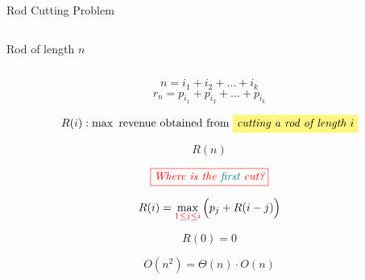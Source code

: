 
\begin{frame}{}
  \centerline{\LARGE {}}

  \vspace{0.50cm}
\end{frame}

\begin{frame}{}
  \begin{exampleblock}{Rod Cutting Problem}
    \begin{columns}
	\begin{center}
	  {\large Rod of length $n$}

	\end{center}
	\begin{table}[]
	  \centering
	\end{table}
    \end{columns}

    \vspace{0.60cm}
    \[
      n = i_1 + i_2 + \dots + i_k
    \]
    \[
      r_n = p_{i_1} + p_{i_2} + \dots + p_{i_k}
    \]
  \end{exampleblock}
\end{frame}

\begin{frame}{}
  \[
    R(i): \max \text{ revenue obtained from \hl{yellow}{\it cutting a rod of length $i$}}
  \]

  \[
    R(n)
  \]

  \pause
  \[
    \textcolor{red}{\fbox{\it Where is the {\textcolor{teal}{first}} cut?}}
  \]

  \pause
  \[
    R(i) = \max_{\textcolor{red}{1 \le j \le i}} \Big(p_j + R(i-j)\Big)
  \]

  \pause
  \[
    R(0) = 0
  \]

  \pause
  \[
    O(n^2) = \Theta(n) \cdot O(n)
  \]
\end{frame}

